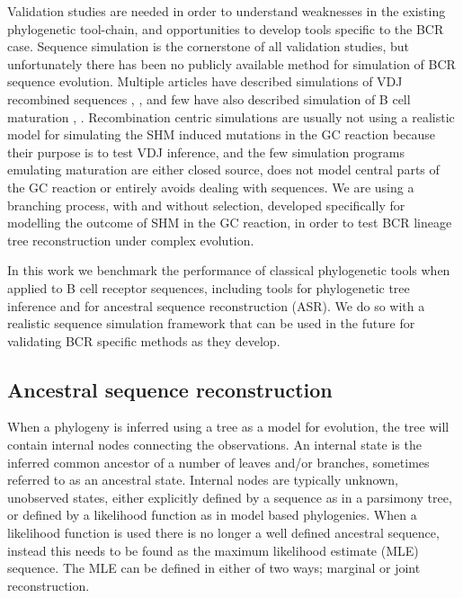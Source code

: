 Validation studies are needed in order to understand weaknesses in the existing phylogenetic tool-chain, and opportunities to develop tools specific to the BCR case.
Sequence simulation is the cornerstone of all validation studies, but unfortunately there has been no publicly available method for simulation of BCR sequence evolution.
Multiple articles have described simulations of VDJ recombined sequences \cite{safonova2015igsimulator}, \cite{ralph2016likelihood}, \cite{russ2015htjoinsolver} and few have also described simulation of B cell maturation \cite{shlomchik1998clone}, \cite{kleinstein2003estimating}.
Recombination centric simulations are usually not using a realistic model for simulating the SHM induced mutations in the GC reaction because their purpose is to test VDJ inference, and the few simulation programs emulating maturation are either closed source, does not model central parts of the GC reaction or entirely avoids dealing with sequences.
We are using a branching process, with and without selection, developed specifically for modelling the outcome of SHM in the GC reaction, in order to test BCR lineage tree reconstruction under complex evolution.

In this work we benchmark the performance of classical phylogenetic tools when applied to B cell receptor sequences, including tools for phylogenetic tree inference and for ancestral sequence reconstruction (ASR).
We do so with a realistic sequence simulation framework that can be used in the future for validating BCR specific methods as they develop.




\subsection{Ancestral sequence reconstruction}
When a phylogeny is inferred using a tree as a model for evolution, the tree will contain internal nodes connecting the observations.
An internal state is the inferred common ancestor of a number of leaves and/or branches, sometimes referred to as an ancestral state.
Internal nodes are typically unknown, unobserved states, either explicitly defined by a sequence as in a parsimony tree, or defined by a likelihood function as in model based phylogenies.
When a likelihood function is used there is no longer a well defined ancestral sequence, instead this needs to be found as the maximum likelihood estimate (MLE) sequence.
The MLE can be defined in either of two ways; marginal or joint reconstruction.

